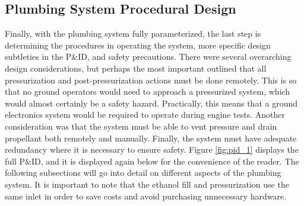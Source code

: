 \documentclass[9pt]{article} %
\numberwithin{equation}{section} %
\begin{document}

\subsection{Plumbing System Procedural Design}
\hspace{\parindent} Finally, with the plumbing system fully parameterized, the last step is determining the procedures in operating the system, more specific design subtleties in the P\&ID, and safety precautions. There were several overarching design considerations, but perhaps the most important outlined that all pressurization and post-pressurization actions must be done remotely. This is so that no ground operators would need to approach a pressurized system, which would almost certainly be a safety hazard. Practically, this means that a ground electronics system would be required to operate during engine tests. Another consideration was that the system must be able to vent pressure and drain propellant both remotely and manually. Finally, the system must have adequate redundancy where it is necessary to ensure safety. Figure \ref{fig:pid_1} displays the full P\&ID, and it is displayed again below for the convenience of the reader. The following subsections will go into detail on different aspects of the plumbing system. It is important to note that the ethanol fill and pressurization use the same inlet in order to save costs and avoid purchasing unnecessary hardware.
\end{document}
